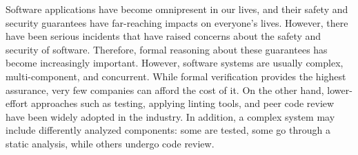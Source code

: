 \documentclass[11pt]{article}
\begin{document}

Software applications have become omnipresent in our lives, and their
safety and security guarantees have far-reaching impacts on everyone's lives.
%
However, there have been serious incidents that have raised
concerns about the safety and security of software.
Therefore, formal reasoning about these guarantees has become increasingly important.
%
However, software systems are usually complex, multi-component, and
concurrent.
%
While formal verification provides the highest assurance,
very few companies can afford the cost of it.
%
On the other hand,
lower-effort approaches such as testing, applying linting tools, and
peer code review have been widely adopted in the industry. 
%
In addition,
a complex system may include differently analyzed components: some are tested, some go through a static analysis, while others undergo code review.
%
\end{document}
